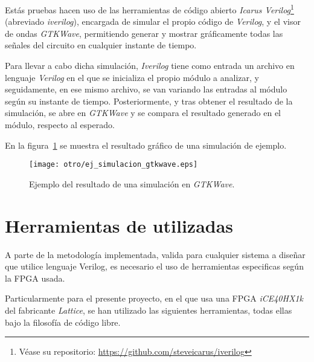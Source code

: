 Estás pruebas hacen uso de las herramientas de código abierto \emph{Icarus Verilog}\footnote{Véase su repositorio: \url{https://github.com/steveicarus/iverilog}} (abreviado \emph{iverilog}), encargada de simular el propio código de \emph{Verilog}, y el visor de ondas \emph{GTKWave}\cite{gtkwave2019}, permitiendo generar y mostrar gráficamente todas las señales del circuito en cualquier instante de tiempo.

Para llevar a cabo dicha simulación, \emph{Iverilog} tiene como entrada un archivo en lenguaje \emph{Verilog} en el que se inicializa el propio módulo a analizar, y seguidamente, en ese mismo archivo, se van variando las entradas al módulo según su instante de tiempo. Posteriormente, y tras obtener el resultado de la simulación, se abre en \emph{GTKWave} y se compara el resultado generado en el módulo, respecto al esperado.

En la figura~\ref{fig:ej-gtkwave} se muestra el resultado gráfico de una simulación de ejemplo.

\begin{figure}[htb]
    \centering
    \texttt{[image: otro/ej\_simulacion\_gtkwave.eps]}
    \caption{Ejemplo del resultado de una simulación en \emph{GTKWave}.}
    \label{fig:ej-gtkwave}
\end{figure}



\section{Herramientas de utilizadas}
A parte de la metodología implementada, valida para cualquier sistema a diseñar que utilice lenguaje Verilog, es necesario el uso de herramientas especificas según la FPGA usada.

Particularmente para el presente proyecto, en el que usa una FPGA \emph{iCE40HX1k} del fabricante \emph{Lattice}, se han utilizado las siguientes herramientas, todas ellas bajo la filosofía de código libre.

